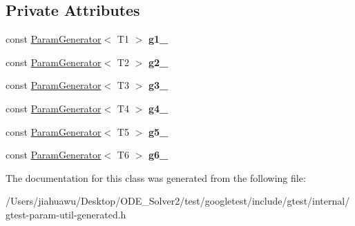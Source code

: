 \subsection*{Private Attributes}
\begin{DoxyCompactItemize}
\item 
\mbox{\label{classtesting_1_1internal_1_1_cartesian_product_generator6_a81f61293deb35e167a71f59c299a3da8}} 
const \mbox{\hyperlink{classtesting_1_1internal_1_1_param_generator}{Param\+Generator}}$<$ T1 $>$ {\bfseries g1\+\_\+}
\item 
\mbox{\label{classtesting_1_1internal_1_1_cartesian_product_generator6_a350b03e86d0113d81d918e1e3697bdb8}} 
const \mbox{\hyperlink{classtesting_1_1internal_1_1_param_generator}{Param\+Generator}}$<$ T2 $>$ {\bfseries g2\+\_\+}
\item 
\mbox{\label{classtesting_1_1internal_1_1_cartesian_product_generator6_a9c02c7049073a52c5fe3255546c4739a}} 
const \mbox{\hyperlink{classtesting_1_1internal_1_1_param_generator}{Param\+Generator}}$<$ T3 $>$ {\bfseries g3\+\_\+}
\item 
\mbox{\label{classtesting_1_1internal_1_1_cartesian_product_generator6_a7f01e0dbe74f79a9abe94a64e967e95d}} 
const \mbox{\hyperlink{classtesting_1_1internal_1_1_param_generator}{Param\+Generator}}$<$ T4 $>$ {\bfseries g4\+\_\+}
\item 
\mbox{\label{classtesting_1_1internal_1_1_cartesian_product_generator6_aa84915ffc8834fb18901f221405a202e}} 
const \mbox{\hyperlink{classtesting_1_1internal_1_1_param_generator}{Param\+Generator}}$<$ T5 $>$ {\bfseries g5\+\_\+}
\item 
\mbox{\label{classtesting_1_1internal_1_1_cartesian_product_generator6_a40767d9c00e76779bb2b42840a1219ab}} 
const \mbox{\hyperlink{classtesting_1_1internal_1_1_param_generator}{Param\+Generator}}$<$ T6 $>$ {\bfseries g6\+\_\+}
\end{DoxyCompactItemize}


The documentation for this class was generated from the following file\+:\begin{DoxyCompactItemize}
\item 
/\+Users/jiahuawu/\+Desktop/\+O\+D\+E\+\_\+\+Solver2/test/googletest/include/gtest/internal/gtest-\/param-\/util-\/generated.\+h\end{DoxyCompactItemize}
